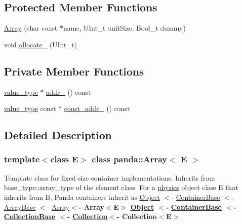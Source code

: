 \subsection*{Protected Member Functions}
\begin{DoxyCompactItemize}
\item 
\hyperlink{classpanda_1_1Array_ae1388498ce5be69e85a07dffc4f21547}{Array} (char const $\ast$name, UInt\_\-t unitSize, Bool\_\-t dummy)
\item 
void \hyperlink{classpanda_1_1Array_ac3bf1d5e18721fed54de1741a71470fc}{allocate\_\-} (UInt\_\-t)
\end{DoxyCompactItemize}
\subsection*{Private Member Functions}
\begin{DoxyCompactItemize}
\item 
\hyperlink{classpanda_1_1Array_a1d3ff416a3960c4cb7a619df25d32359}{value\_\-type} $\ast$ \hyperlink{classpanda_1_1Array_a7ccf276765e6e092bea87b7181053ac5}{addr\_\-} () const 
\item 
\hyperlink{classpanda_1_1Array_a1d3ff416a3960c4cb7a619df25d32359}{value\_\-type} const $\ast$ \hyperlink{classpanda_1_1Array_a5ff7c75decc7a9e8710b8350f1c11768}{const\_\-addr\_\-} () const 
\end{DoxyCompactItemize}


\subsection{Detailed Description}
\subsubsection*{template$<$class E$>$ class panda::Array$<$ E $>$}

Template class for fixed-\/size container implementations. Inherits from base\_\-type::array\_\-type of the element class. For a \hyperlink{namespacepanda_1_1physics}{physics} object class E that inherits from B, Panda containers inherit as \hyperlink{classpanda_1_1Object}{Object} $<$-\/ \hyperlink{classpanda_1_1ContainerBase}{ContainerBase} $<$-\/ \hyperlink{classpanda_1_1ArrayBase}{ArrayBase} $<$-\/ \hyperlink{classpanda_1_1Array}{Array}{\bfseries  $<$-\/ Array$<$E$>$ \hyperlink{classpanda_1_1Object}{Object} $<$-\/ \hyperlink{classpanda_1_1ContainerBase}{ContainerBase} $<$-\/ \hyperlink{classpanda_1_1CollectionBase}{CollectionBase} $<$-\/ \hyperlink{classpanda_1_1Collection}{Collection}{\bfseries  $<$-\/ Collection$<$E$>$ }}

